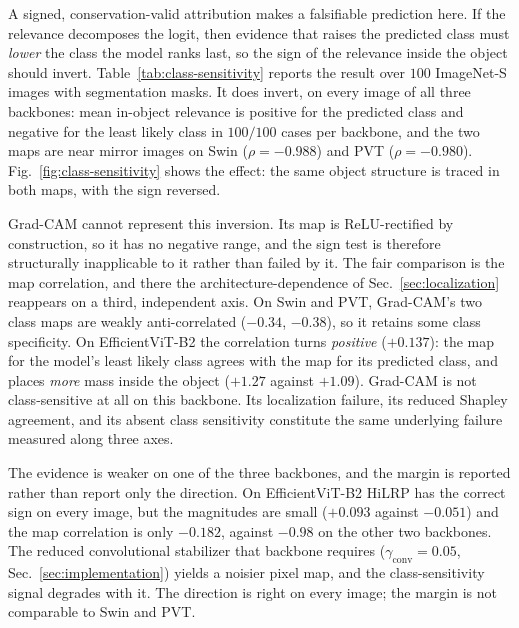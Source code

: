\documentclass[lettersize,journal]{IEEEtran}
\theoremstyle{definition}
\theoremstyle{plain}
\begin{document}
A signed, conservation-valid attribution makes a falsifiable prediction here. If
the relevance decomposes the logit, then evidence that raises the predicted
class must \emph{lower} the class the model ranks last, so the sign of the
relevance inside the object should invert. Table~\ref{tab:class-sensitivity}
reports the result over $100$ ImageNet-S images with segmentation masks. It does
invert, on every image of all three backbones: mean in-object relevance is
positive for the predicted class and negative for the least likely class in
$100/100$ cases per backbone, and the two maps are near mirror images on Swin
($\rho=-0.988$) and PVT ($\rho=-0.980$). Fig.~\ref{fig:class-sensitivity} shows
the effect: the same object structure is traced in both maps, with the sign
reversed.

Grad-CAM cannot represent this inversion. Its map is $\mathrm{ReLU}$-rectified by
construction, so it has no negative range, and the sign test is therefore
structurally inapplicable to it rather than failed by it. The fair comparison is the map
correlation, and there the architecture-dependence of Sec.~\ref{sec:localization}
reappears on a third, independent axis. On Swin and PVT, Grad-CAM's two class
maps are weakly anti-correlated ($-0.34$, $-0.38$), so it retains some class
specificity. On EfficientViT-B2 the correlation turns \emph{positive}
($+0.137$): the map for the model's least likely class agrees with the map for
its predicted class, and places \emph{more} mass inside the object ($+1.27$
against $+1.09$). Grad-CAM is not class-sensitive at all on this backbone. Its
localization failure, its reduced Shapley agreement, and its absent class
sensitivity constitute the same underlying failure measured along three axes.

The evidence is weaker on one of the three backbones, and the margin is reported
rather than report only the direction. On EfficientViT-B2 HiLRP has the correct
sign on every image, but the magnitudes are small ($+0.093$ against $-0.051$)
and the map correlation is only $-0.182$, against $-0.98$ on the other two
backbones.
The reduced convolutional stabilizer that backbone requires
($\gamma_{\text{conv}}{=}0.05$, Sec.~\ref{sec:implementation}) yields a noisier
pixel map, and the class-sensitivity signal degrades with it. The direction is
right on every image; the margin is not comparable to Swin and PVT.
\end{document}
